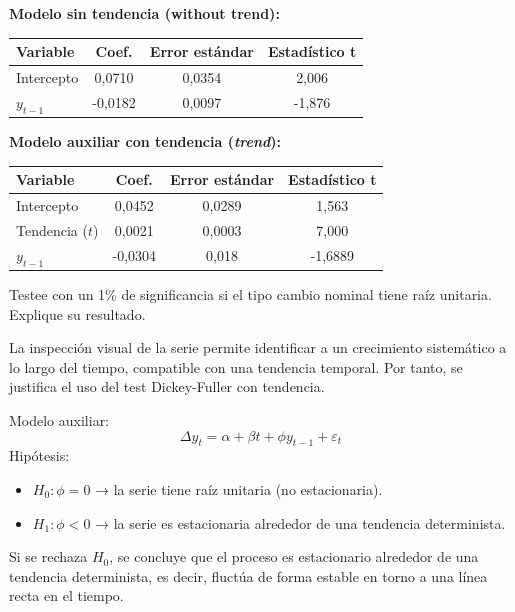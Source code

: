 \documentclass[10pt,a4paper]{article}
\begin{document}
\begin{enumerate}
   \textbf{Modelo sin tendencia (without trend):}
    \begin{table}[H]
    \centering
    \begin{tabular}{lccc}
    \toprule
    Variable & Coef. & Error estándar & Estadístico t \\
    \midrule
    Intercepto & 0,0710 & 0,0354 & 2,006 \\
    $y_{t-1}$  & -0,0182 & 0,0097 & -1,876 \\
    \bottomrule
    \end{tabular}
    \end{table}

    \textbf{Modelo auxiliar con tendencia (\textit{trend}):}
    \begin{table}[H]
    \centering
    \begin{tabular}{lccc}
    \toprule
    Variable & Coef. & Error estándar & Estadístico t \\
    \midrule
    Intercepto & 0,0452 & 0,0289 & 1,563 \\
    Tendencia ($t$) & 0,0021 & 0,0003 & 7,000 \\
    $y_{t-1}$  & -0,0304 & 0,018 & -1,6889 \\
    \bottomrule
    \end{tabular}
    \end{table}

  Testee con un 1\% de significancia si el tipo cambio nominal tiene raíz unitaria. Explique su resultado.  


{\color{blue}
  
La inspección visual de la serie permite identificar a un crecimiento sistemático a lo largo del tiempo, compatible con una tendencia temporal. Por tanto, se justifica el uso del test Dickey-Fuller con tendencia.


Modelo auxiliar: \\
\[ 
\Delta y_t = \alpha + \beta t + \phi y_{t-1} + \varepsilon_t 
\]
Hipótesis:
\begin{itemize}
    \item \( H_0: \phi = 0 \) → la serie tiene raíz unitaria (no estacionaria).
    \item \( H_1: \phi < 0 \) → la serie es estacionaria alrededor de una tendencia determinista.
\end{itemize}


Si se rechaza \( H_0 \), se concluye que el proceso es estacionario alrededor de una tendencia determinista, es decir, fluctúa de forma estable en torno a una línea recta en el tiempo.


}
\end{enumerate}
\end{document}

